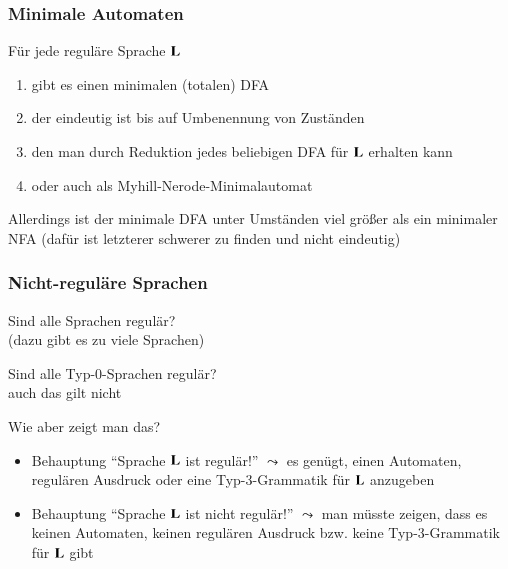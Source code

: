 \documentclass[aspectratio=1610,onlymath]{beamer}
\begin{document}
\maketitle


\begin{frame}\frametitle{Minimale Automaten}

Für jede reguläre Sprache $\textbf{\textcolor{black}{L}}$
\begin{enumerate}[\ldots]
\item gibt es einen minimalen (totalen) DFA 
\item der eindeutig ist bis auf Umbenennung von Zuständen
\item den man durch Reduktion jedes beliebigen DFA für $\textbf{\textcolor{black}{L}}$ erhalten kann
\item oder auch als Myhill-Nerode-Minimalautomat
\end{enumerate}
\bigskip

Allerdings ist der minimale DFA unter Umständen viel größer als ein minimaler NFA
(dafür ist letzterer schwerer zu finden und nicht eindeutig)

\end{frame}



\begin{frame}\frametitle{Nicht-reguläre Sprachen}

Sind alle Sprachen regulär?\\
 (dazu gibt es zu viele Sprachen)
\bigskip

Sind alle Typ-0-Sprachen regulär?\\
 auch das gilt nicht
\bigskip

\alert{Wie aber zeigt man das?}
\begin{itemize}
\item Behauptung "`Sprache $\textbf{\textcolor{black}{L}}$ ist regulär!"' $\leadsto$ es genügt, \alert{einen} Automaten, regulären Ausdruck oder eine Typ-3-Grammatik für $\textbf{\textcolor{black}{L}}$ anzugeben
\item Behauptung "`Sprache $\textbf{\textcolor{black}{L}}$ ist nicht regulär!"' $\leadsto$ man müsste zeigen, dass es \alert{keinen} Automaten, \alert{keinen} regulären Ausdruck bzw. \alert{keine} Typ-3-Grammatik für $\textbf{\textcolor{black}{L}}$ gibt
\end{itemize}

\end{frame}
\end{document}
